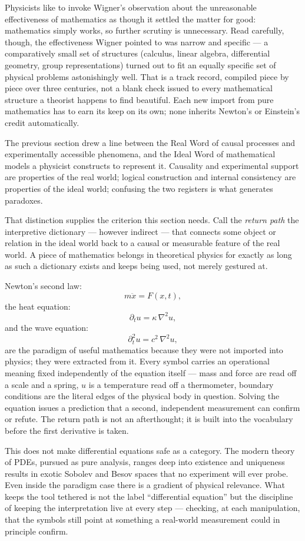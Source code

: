 Physicists like to invoke Wigner's observation about the unreasonable
effectiveness of mathematics as though it settled the matter for good:
mathematics simply works, so further scrutiny is unnecessary. Read carefully,
though, the effectiveness Wigner pointed to was narrow and specific --- a
comparatively small set of structures (calculus, linear algebra, differential
geometry, group representations) turned out to fit an equally specific set of
physical problems astonishingly well. That is a track record, compiled piece by
piece over three centuries, not a blank check issued to every mathematical
structure a theorist happens to find beautiful. Each new import from pure
mathematics has to earn its keep on its own; none inherits Newton's or
Einstein's credit automatically.

The previous section drew a line between the Real Word of causal processes and
experimentally accessible phenomena, and the Ideal Word of mathematical models
a physicist constructs to represent it. Causality and experimental support are
properties of the real world; logical construction and internal consistency are
properties of the ideal world; confusing the two registers is what generates
paradoxes.

That distinction supplies the criterion this section needs. Call the
\emph{return path} the interpretive dictionary --- however indirect --- that
connects some object or relation in the ideal world back to a causal or
measurable feature of the real world. A piece of mathematics belongs in
theoretical physics for exactly as long as such a dictionary exists and keeps
being used, not merely gestured at.

Newton's second law: 
\[m\ddot{x} = F(x,t),\] 
the heat equation: 
\[\partial_t u =\kappa\,\nabla^2 u,\] 
and the wave equation:
\[\partial_t^2 u = c^2\,\nabla^2 u,\]
are the paradigm of useful mathematics because they were not imported into
physics; they were extracted from it. Every symbol carries an operational
meaning fixed independently of the equation itself --- mass and force are read
off a scale and a spring, $u$ is a temperature read off a thermometer, boundary
conditions are the literal edges of the physical body in question. Solving the
equation issues a prediction that a second, independent measurement can confirm
or refute. The return path is not an afterthought; it is built into the
vocabulary before the first derivative is taken.

This does not make differential equations safe as a category. The modern theory
of PDEs, pursued as pure analysis, ranges deep into existence and uniqueness
results in exotic Sobolev and Besov spaces that no experiment will ever probe.
Even inside the paradigm case there is a gradient of physical relevance. What
keeps the tool tethered is not the label ``differential equation'' but the
discipline of keeping the interpretation live at every step --- checking, at
each manipulation, that the symbols still point at something a real-world
measurement could in principle confirm.

